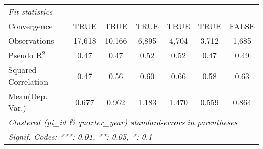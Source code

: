 \begin{tabular}{lcccccc}
   \midrule
   \emph{Fit statistics}\\
   Convergence                                                &TRUE     & TRUE    & TRUE          & TRUE          & TRUE          & FALSE\\  
   Observations                                               & 17,618  & 10,166  & 6,895         & 4,704         & 3,712         & 1,685\\  
   Pseudo R$^2$                                               & 0.47    & 0.47    & 0.52          & 0.52          & 0.47          & 0.49\\  
   Squared Correlation                                        & 0.47    & 0.56    & 0.60          & 0.66          & 0.58          & 0.63\\  
Mean(Dep. Var.) & 0.677 & 0.962 & 1.183 & 1.470 & 0.559 & 0.864 \\
   \midrule \midrule
   \multicolumn{7}{l}{\emph{Clustered (pi\_id \& quarter\_year) standard-errors in parentheses}}\\
   \multicolumn{7}{l}{\emph{Signif. Codes: ***: 0.01, **: 0.05, *: 0.1}}\\
\end{tabular}
\par\endgroup
